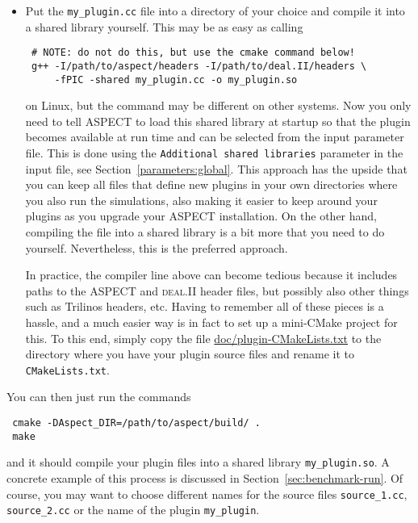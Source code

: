 \documentclass{article}
\newcommand{\dealii}{{\textsc{deal.II}}}
\newcommand{\aspect}{\textsc{ASPECT}}
\begin{document}
\begin{itemize}
\begin{itemize}
    \item Put the  \texttt{my\_plugin.cc} file into a directory of your choice
    and compile it into a shared library yourself. This may be as easy as
    calling
    \begin{verbatim}
 # NOTE: do not do this, but use the cmake command below!
 g++ -I/path/to/aspect/headers -I/path/to/deal.II/headers \
     -fPIC -shared my_plugin.cc -o my_plugin.so
    \end{verbatim}
    on Linux, but the command may be different on other systems. Now you only
    need to tell \aspect{} to load this shared library at startup so that the
    plugin becomes available at run time and can be selected from the input
    parameter file. This is done using the \texttt{Additional shared libraries}
    \index[prmindex]{Additional shared libraries}
    parameter in the input file, see Section~\ref{parameters:global}. This
    approach has the upside that you can keep all files that define new plugins
    in your own directories where you also run the simulations, also making it
    easier to keep around your plugins as you upgrade your \aspect{}
    installation. On the other hand, compiling the file into a shared library is
    a bit more that you need to do yourself. Nevertheless, this is the preferred
    approach.

    In practice, the compiler line above can become tedious because it includes
    paths to the \aspect{} and \dealii{} header files, but possibly also other
    things such as Trilinos headers, etc. Having to remember all of these pieces
    is a hassle, and a much easier way is in fact to set up a mini-CMake project
    for this. To this end, simply copy the file \url{doc/plugin-CMakeLists.txt}
    to the directory where you have your plugin source files and rename it to
    \texttt{CMakeLists.txt}.
  \end{itemize}
  You can then just run the commands
    \begin{verbatim}
 cmake -DAspect_DIR=/path/to/aspect/build/ .
 make
    \end{verbatim}
    and it should compile your plugin files into a shared library
    \texttt{my\_plugin.so}. A concrete example of this process is discussed in
    Section~\ref{sec:benchmark-run}. Of course, you may want to choose different names
    for the source files \texttt{source\_1.cc}, \texttt{source\_2.cc} or the name of
    the plugin \texttt{my\_plugin}.


\end{itemize}
\end{document}
